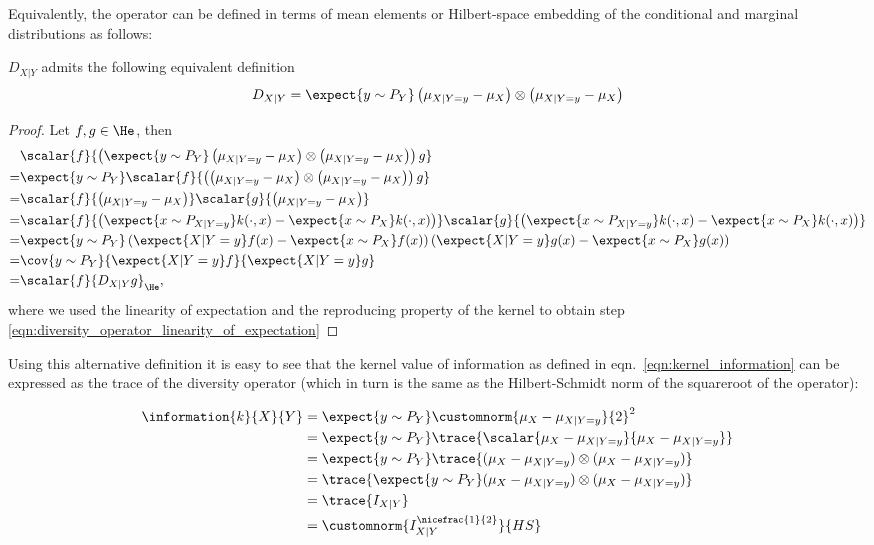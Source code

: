 Equivalently, the operator can be defined in terms of mean elements or Hilbert-space embedding of the conditional and marginal distributions as follows:

\begin{statement}
$D_{X\vert Y}$ admits the following equivalent definition
\begin{align}
	D_{X\vert Y} = \expect{y\sim P_Y} \left(\mu_{X\vert Y=y} - \mu_{X}\right) \otimes \left(\mu_{X\vert Y=y}  - \mu_{X} \right)
\end{align}

\begin{proof}
Let $f,g\in\He$, then
\begin{align}
	&\scalar{f}{ \left(\expect{y\sim P_Y}\left(\mu_{X\vert Y=y} - \mu_{X}\right) \otimes \left(\mu_{X\vert Y=y}  - \mu_{X} \right)\right) g}\\
	=&\expect{y\sim P_Y}\scalar{f}{ \left(\left(\mu_{X\vert Y=y} - \mu_{X}\right) \otimes \left(\mu_{X\vert Y=y}  - \mu_{X} \right)\right) g}\\
	=& \scalar{f}{\left(\mu_{X\vert Y=y} - \mu_{X}\right)}\scalar{g}{\left(\mu_{X\vert Y=y} - \mu_{X}\right)}\\
	=& \scalar{f}{\left(\expect{x\sim P_{X\vert Y=y}}k(\cdot,x) - \expect{x\sim P_X}k(\cdot,x)\right)}\scalar{g}{\left(\expect{x\sim P_{X\vert Y=y}}k(\cdot,x) - \expect{x\sim P_X}k(\cdot,x)\right)}\\
	=& \expect{y\sim P_Y} \left(\expect{X\vert Y=y} f(x) - \expect{x\sim P_X}f(x)\right)\left(\expect{X\vert Y=y} g(x) - \expect{x\sim P_X}g(x)\right)\label{eqn:diversity_operator_linearity_of_expectation}\\
	=& \cov{y\sim P_Y}{\expect{X\vert Y=y} f}{\expect{X\vert Y=y} g}\\
	=& \scalar{f}{D_{X\vert Y}g}_{\He},
\end{align}
where we used the linearity of expectation and the reproducing property of the kernel to obtain step \eqref{eqn:diversity_operator_linearity_of_expectation}
\end{proof}
\end{statement}

Using this alternative definition it is easy to see that the kernel value of information as defined in eqn.\ \eqref{eqn:kernel_information} can be expressed as the trace of the diversity operator (which in turn is the same as the Hilbert-Schmidt norm of the squareroot of the operator):

\begin{align}
	\information{k}{X}{Y} &= \expect{y \sim P_{Y}} \customnorm{\mu_X - \mu_{X\vert Y=y}}{2}^2\\
		&= \expect{y \sim P_{Y}} \trace{\scalar{\mu_X - \mu_{X\vert Y=y}}{\mu_X - \mu_{X\vert Y=y}}}\\
		&= \expect{y \sim P_{Y}} \trace{ ( \mu_X - \mu_{X\vert Y=y}) \otimes (\mu_X - \mu_{X\vert Y=y})}\\
		&= \trace{ \expect{y \sim P_{Y}} ( \mu_X - \mu_{X\vert Y=y}) \otimes (\mu_X - \mu_{X\vert Y=y})} \\
		&= \trace{I_{X\vert Y}}\\
		&= \customnorm{I_{X\vert Y}^{\nicefrac{1}{2}}}{HS}
\end{align}

